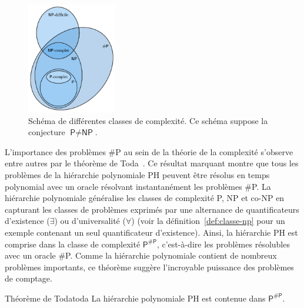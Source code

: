 \begin{figure}[h!]
    \centering
    \includegraphics[width=0.35\textwidth]{figures/complexity-classes.png}
    \caption[Classes de complexité]{Schéma de différentes classes de complexité. Ce schéma suppose la conjecture $\textsf{P} \neq \textsf{NP}$.}
    \label{fig:complexity-classes}
\end{figure}

L'importance des problèmes \textsf{\#P} au sein de la théorie de la complexité s'observe entre autres par le théorème de Toda~\cite{todaPPHardPolynomialTime1991}. Ce résultat marquant montre que tous les problèmes de la hiérarchie polynomiale \textsf{PH} peuvent être résolus en temps polynomial avec un oracle résolvant instantanément les problèmes \textsf{\#P}. La hiérarchie polynomiale généralise les classes de complexité \textsf{P}, \textsf{NP} et \textsf{co-NP} en capturant les classes de problèmes exprimés par une alternance de quantificateurs d'existence ($\exists$) ou d'universalité ($\forall$) (voir la définition~\ref{def:classe-np} pour un exemple contenant un seul quantificateur d'existence). Ainsi, la hiérarchie \textsf{PH} est comprise dans la classe de complexité $\textsf{P}^{\textsf{\#P}}$, c'est-à-dire les problèmes résolubles avec un oracle \textsf{\#P}. Comme la hiérarchie polynomiale contient de nombreux problèmes importants, ce théorème suggère l'incroyable puissance des problèmes de comptage.

\begin{subtheorem}{Théorème de Toda}{toda}
    La hiérarchie polynomiale \textsf{PH} est contenue dans $\textsf{P}^{\textsf{\#P}}$.
\end{subtheorem}

